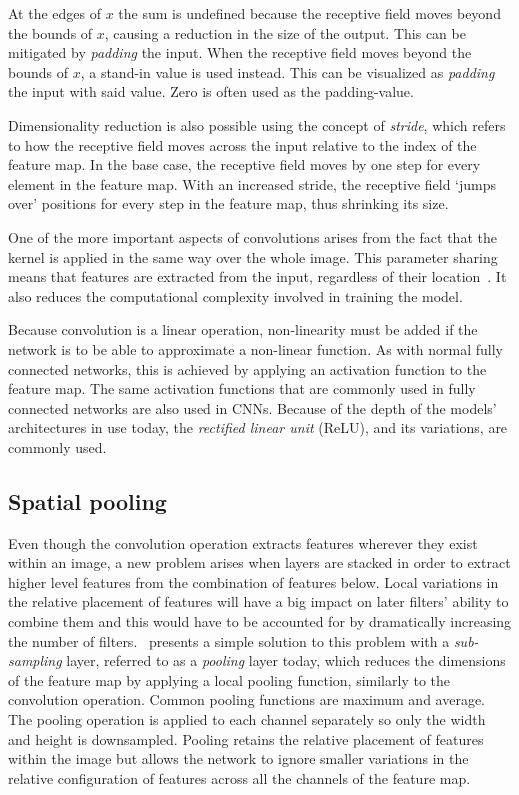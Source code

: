 At the edges of \(x\) the sum is undefined because the receptive field moves beyond the bounds of \(x\), causing a reduction in the size of the output.
This can be mitigated by \textit{padding} the input.
When the receptive field moves beyond the bounds of \(x\), a stand-in value is used instead.
This can be visualized as \textit{padding} the input with said value.
Zero is often used as the padding-value.

Dimensionality reduction is also possible using the concept of \textit{stride}, which refers to how the receptive field moves across the input relative to the index of the feature map.
In the base case, the receptive field moves by one step for every element in the feature map.
With an increased stride, the receptive field `jumps over' positions for every step in the feature map, thus shrinking its size.

One of the more important aspects of convolutions arises from the fact that the kernel is applied in the same way over the whole image.
This parameter sharing means that features are extracted from the input, regardless of their location\ \parencite{lecum1989}.
It also reduces the computational complexity involved in training the model.

Because convolution is a linear operation, non-linearity must be added if the network is to be able to approximate a non-linear function.
As with normal fully connected networks, this is achieved by applying an activation function to the feature map.
The same activation functions that are commonly used in fully connected networks are also used in CNNs.
Because of the depth of the models’ architectures in use today, the \textit{rectified linear unit} (ReLU), and its variations, are commonly used.

\subsection{Spatial pooling}
Even though the convolution operation extracts features wherever they exist within an image, a new problem arises when layers are stacked in order to extract higher level features from the combination of features below.
Local variations in the relative placement of features will have a big impact on later filters' ability to combine them and this would have to be accounted for by dramatically increasing the number of filters.\ \textcite{lecun1998gradient} presents a simple solution to this problem with a \textit{sub-sampling} layer, referred to as a \textit{pooling} layer today, which reduces the dimensions of the feature map by applying a local pooling function, similarly to the convolution operation.
Common pooling functions are maximum and average.
The pooling operation is applied to each channel separately so only the width and height is downsampled.
Pooling retains the relative placement of features within the image but allows the network to ignore smaller variations in the relative configuration of features across all the channels of the feature map.

